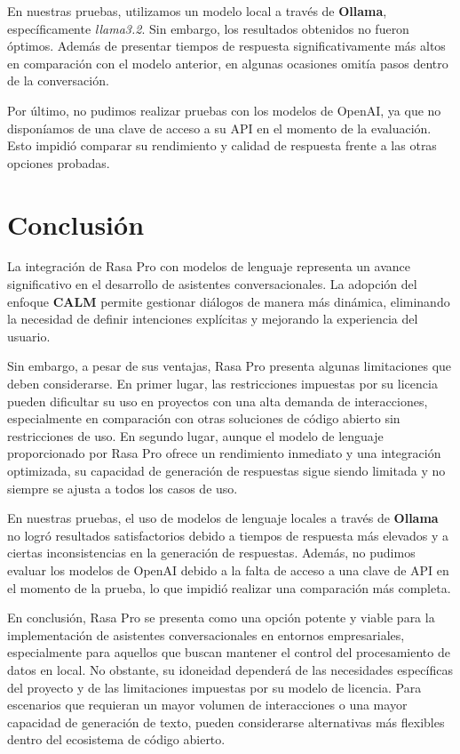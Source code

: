 \documentclass[a4paper,11pt]{article}
\begin{document}
			En nuestras pruebas, utilizamos un modelo local a través de \textbf{Ollama}, específicamente \textit{llama3.2}. Sin embargo, los resultados obtenidos no fueron óptimos. Además de presentar tiempos de respuesta significativamente más altos en comparación con el modelo anterior, en algunas ocasiones omitía pasos dentro de la conversación.  
			
			Por último, no pudimos realizar pruebas con los modelos de OpenAI, ya que no disponíamos de una clave de acceso a su API en el momento de la evaluación. Esto impidió comparar su rendimiento y calidad de respuesta frente a las otras opciones probadas.
	
	\section{Conclusión}
	
		La integración de Rasa Pro con modelos de lenguaje representa un avance significativo en el desarrollo de asistentes conversacionales. La adopción del enfoque \textbf{CALM} permite gestionar diálogos de manera más dinámica, eliminando la necesidad de definir intenciones explícitas y mejorando la experiencia del usuario.  
		
		Sin embargo, a pesar de sus ventajas, Rasa Pro presenta algunas limitaciones que deben considerarse. En primer lugar, las restricciones impuestas por su licencia pueden dificultar su uso en proyectos con una alta demanda de interacciones, especialmente en comparación con otras soluciones de código abierto sin restricciones de uso. En segundo lugar, aunque el modelo de lenguaje proporcionado por Rasa Pro ofrece un rendimiento inmediato y una integración optimizada, su capacidad de generación de respuestas sigue siendo limitada y no siempre se ajusta a todos los casos de uso.  
		
		En nuestras pruebas, el uso de modelos de lenguaje locales a través de \textbf{Ollama} no logró resultados satisfactorios debido a tiempos de respuesta más elevados y a ciertas inconsistencias en la generación de respuestas. Además, no pudimos evaluar los modelos de OpenAI debido a la falta de acceso a una clave de API en el momento de la prueba, lo que impidió realizar una comparación más completa.  
		
		En conclusión, Rasa Pro se presenta como una opción potente y viable para la implementación de asistentes conversacionales en entornos empresariales, especialmente para aquellos que buscan mantener el control del procesamiento de datos en local. No obstante, su idoneidad dependerá de las necesidades específicas del proyecto y de las limitaciones impuestas por su modelo de licencia. Para escenarios que requieran un mayor volumen de interacciones o una mayor capacidad de generación de texto, pueden considerarse alternativas más flexibles dentro del ecosistema de código abierto.  
		
		\newpage		
		  
		
	
\end{document}
